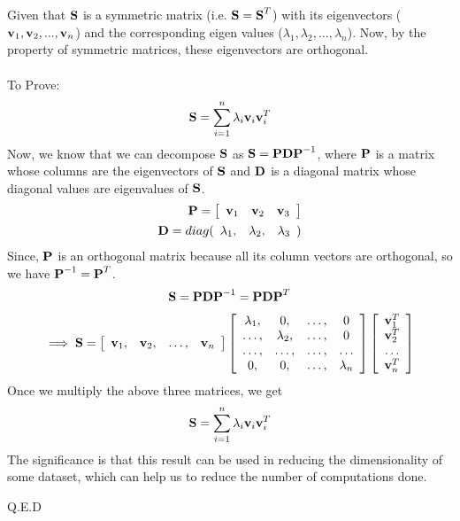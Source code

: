 \documentclass[12pt, a4paper]{article}
\begin{document}
\section{}
Given that $\textbf{S}$ is a symmetric matrix (i.e. $\textbf{S} = \textbf{S}^T$) with its eigenvectors ($\textbf{v}_1,\textbf{v}_2, ..., \textbf{v}_n$) and the corresponding eigen values ($\lambda_1,\lambda_2, ..., \lambda_n$). Now, by the property of symmetric matrices, these eigenvectors are orthogonal. \\ \\
To Prove:
\begin{align*}
    \textbf{S} &= \sum_{i=1}^{n} \lambda_{i} \textbf{v}_i \textbf{v}^{T}_i\\
\end{align*}
Now, we know that we can decompose $\textbf{S}$ as $\textbf{S} = \textbf{P} \textbf{D} \textbf{P}^{-1}$, where $\textbf{P}$ is a matrix whose columns are the eigenvectors of $\textbf{S}$ and $\textbf{D}$ is a diagonal matrix whose diagonal values are eigenvalues of $\textbf{S}$.
\begin{align*}
    \textbf{P} = \left[ {\begin{array}{ccc}
        \textbf{v}_1 & \textbf{v}_2 & \textbf{v}_3
    \end{array} } \right] \\
    \textbf{D} = diag( {\begin{array}{ccc}
        \lambda_1 ,& \lambda_2 ,& \lambda_3
    \end{array} } )
\end{align*}
Since, $\textbf{P}$ is an orthogonal matrix because all its column vectors are orthogonal, so we have $\textbf{P}^{-1} = \textbf{P}^T$.
\begin{align*}
\textbf{S} = \textbf{P} \textbf{D} \textbf{P}^{-1} = \textbf{P} \textbf{D} \textbf{P}^{T}
\end{align*}
\begin{align*}
\implies \textbf{S} =
    \left[ {\begin{array}{cccc}
        \textbf{v}_1,& \textbf{v}_2,& \ldots,& \textbf{v}_n
    \end{array} } \right]
    \left[ {\begin{array}{cccc}
        \lambda_1 ,& 0 ,& \ldots ,& 0 \\
        \ldots ,& \lambda_2 ,& \ldots ,& 0 \\
        \ldots ,& \ldots ,& \ldots ,& \ldots \\
        0 ,& 0 ,& \ldots ,& \lambda_n
    \end{array} } \right]
    \left[ {\begin{array}{c}
        \textbf{v}_1^T \\
        \textbf{v}_2^T \\
        \ldots \\
        \textbf{v}_n^T
    \end{array} } \right]
\end{align*}
Once we multiply the above three matrices, we get
\begin{align*}
    \textbf{S} &= \sum_{i=1}^{n} \lambda_{i} \textbf{v}_i \textbf{v}^{T}_i\\
\end{align*}
The significance is that this result can be used in reducing the dimensionality of some dataset, which can help us to reduce the number of computations done.

\hspace*{\fill} Q.E.D
\end{document}
